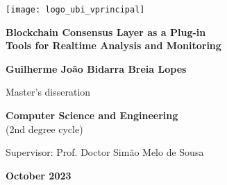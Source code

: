 \begin{titlepage}
\begin{center}

\begin{flushright}
 \texttt{[image: logo\_ubi\_vprincipal]}\\


\vspace{7.6cm}

\rostotitulo \textbf{Blockchain Consensus Layer as a Plug-in} \\
\rostosubtit \textbf{Tools for Realtime Analysis and Monitoring}\\

\vspace{1.8cm}

\rostonomes \textbf{Guilherme João Bidarra Breia Lopes}\\

\vspace{1.4cm}


\rostooutros Master's disseration 

\rostonomes \textbf{Computer Science and Engineering}\\
\rostooutros (2nd degree cycle)\\

\vspace{3.3cm}

\rostooutros Supervisor: Prof. Doctor Simão Melo de Sousa\\

\vspace{1.4cm}

\rostooutros \textbf{October 2023}

\end{flushright}

\end{center}
\end{titlepage}
